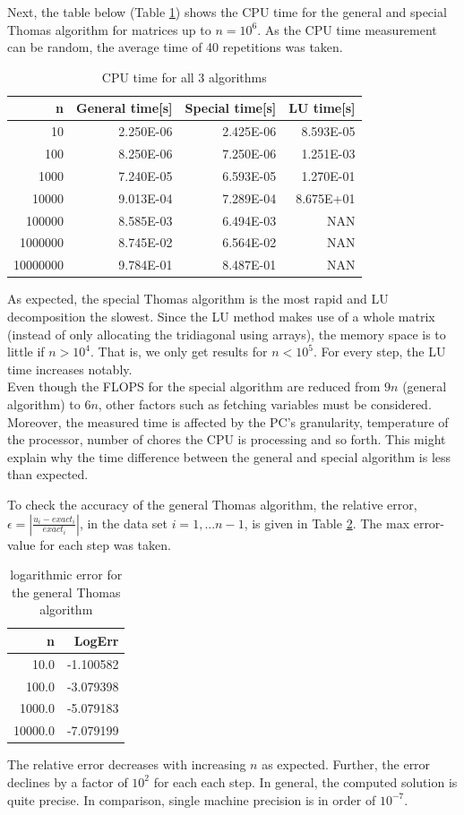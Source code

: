 \documentclass[%
oneside,                 %
final,                   %
10pt]{article}
\begin{document}
Next, the table below (Table \ref{CPUtime}) shows the CPU time for the general and special Thomas algorithm for matrices up to $n=10^6$. As the CPU time measurement can be random, the average time of 40 repetitions was taken.
\begin{table}[H]
\caption{CPU time for all 3 algorithms}
\centering
\begin{tabular}{rrrr}
\toprule
    n & General time[s] & Special time[s] & LU time[s] \\
\midrule
    10 &    2.250E-06 &    2.425E-06 &  8.593E-05 \\
   100 &    8.250E-06 &    7.250E-06 &  1.251E-03 \\
   1000 &    7.240E-05 &    6.593E-05 &  1.270E-01 \\
  10000 &    9.013E-04 &    7.289E-04 &  8.675E+01 \\
  100000 &    8.585E-03 &    6.494E-03 &     NAN \\
 1000000 &    8.745E-02 &    6.564E-02 &     NAN \\
 10000000 &    9.784E-01 &    8.487E-01 &     NAN \\
\bottomrule
\end{tabular}
\label{CPUtime}
\end{table}
As expected, the special Thomas algorithm is the most rapid and LU decomposition the slowest. Since the LU method makes use of a whole matrix (instead of only allocating the tridiagonal using arrays), the memory space is to little if $n>10^4$. That is, we only get results for $n<10^5$.
For every step, the LU time increases notably.\\
Even though the FLOPS for the special algorithm are reduced from $9n$ (general algorithm) to $6n$, other factors such as fetching variables must be considered. Moreover, the measured time is affected by the PC's granularity, temperature of the processor, number of chores the CPU is processing and so forth. This might explain why the time difference between the general and special algorithm is less than expected.

To check the accuracy of the general Thomas algorithm, the relative error, $  \epsilon =  \left\lvert \frac{u_i-exact_i}{exact_i} \right\rvert$, in the data set $i=1,...n-1$, is given in Table \ref{LogError}. The max error-value for each step was taken.
\begin{table}[H]
\caption{logarithmic error for the general Thomas algorithm}
\centering
\begin{tabular}{rr}
\toprule
    n &  LogErr \\
\midrule
  10.0 & -1.100582 \\
  100.0 & -3.079398 \\
 1000.0 & -5.079183 \\
 10000.0 & -7.079199 \\
\bottomrule
\end{tabular}
\label{LogError}
\end{table}
The relative error decreases with increasing $n$ as expected. Further, the error declines by a factor of $10^2$ for each each step. In general, the computed solution is quite precise. In comparison, single machine precision is in order of $10^{-7}$.
\end{document}
